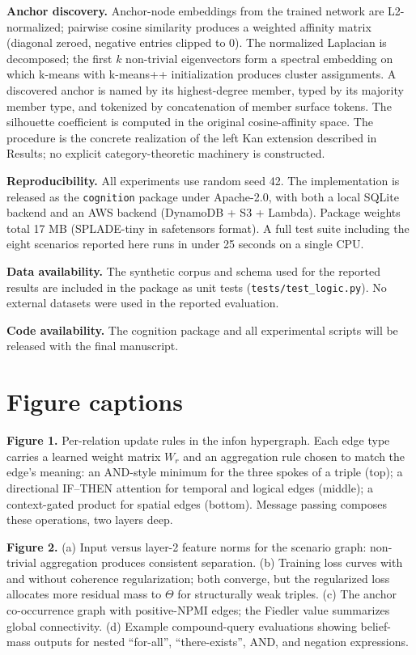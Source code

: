 \documentclass[11pt,a4paper]{article}
\begin{document}
\textbf{Anchor discovery.} Anchor-node embeddings from the
trained network are L2-normalized; pairwise cosine similarity
produces a weighted affinity matrix (diagonal zeroed,
negative entries clipped to 0). The normalized Laplacian is
decomposed; the first $k$ non-trivial eigenvectors form a
spectral embedding on which k-means with k-means++
initialization produces cluster assignments. A discovered
anchor is named by its highest-degree member, typed by its
majority member type, and tokenized by concatenation of
member surface tokens. The silhouette coefficient is computed
in the original cosine-affinity space. The procedure is the
concrete realization of the left Kan extension described in
Results; no explicit category-theoretic machinery is
constructed.

\textbf{Reproducibility.} All experiments use random seed 42.
The implementation is released as the \texttt{cognition}
package under Apache-2.0, with both a local SQLite backend
and an AWS backend (DynamoDB + S3 + Lambda). Package weights
total 17 MB (SPLADE-tiny in safetensors format). A full test
suite including the eight scenarios reported here runs in
under 25 seconds on a single CPU.

\textbf{Data availability.} The synthetic corpus and schema
used for the reported results are included in the package as
unit tests (\texttt{tests/test\_logic.py}). No external
datasets were used in the reported evaluation.

\textbf{Code availability.} The cognition package and all
experimental scripts will be released with the final
manuscript.

\section*{Figure captions}

\textbf{Figure 1.} Per-relation update rules in the infon
hypergraph. Each edge type carries a learned weight matrix
$W_r$ and an aggregation rule chosen to match the edge's
meaning: an AND-style minimum for the three spokes of a
triple (top); a directional IF--THEN attention for temporal
and logical edges (middle); a context-gated product for
spatial edges (bottom). Message passing composes these
operations, two layers deep.

\textbf{Figure 2.} (a) Input versus layer-2 feature norms for
the scenario graph: non-trivial aggregation produces
consistent separation. (b) Training loss curves with and
without coherence regularization; both converge, but the
regularized loss allocates more residual mass to $\Theta$ for
structurally weak triples. (c) The anchor co-occurrence graph
with positive-NPMI edges; the Fiedler value summarizes global
connectivity. (d) Example compound-query evaluations showing
belief-mass outputs for nested ``for-all'', ``there-exists'',
AND, and negation expressions.
\end{document}
